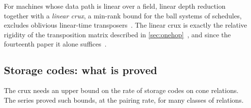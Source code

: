 For machines whose data path is linear over a field, linear depth reduction together with a \emph{linear crux}, a
min-rank bound for the ball systems of schedules, excludes oblivious linear-time
transposers~\cite[Theorem~7.5]{EighthPaper2026}. The linear crux is exactly the relative rigidity of the transposition
matrix described in \cref{sec:onehop}~\cite[Problem~10.6]{EighthPaper2026}, and since the fourteenth paper it alone
suffices~\cite[Corollary~9.3(c)]{BoundedStack2026}.

\subsection{Storage codes: what is proved}\label{sec:proved}

The crux needs an upper bound on the rate of storage codes on cone relations. The series proved such bounds, at the
pairing rate, for many classes of relations.
